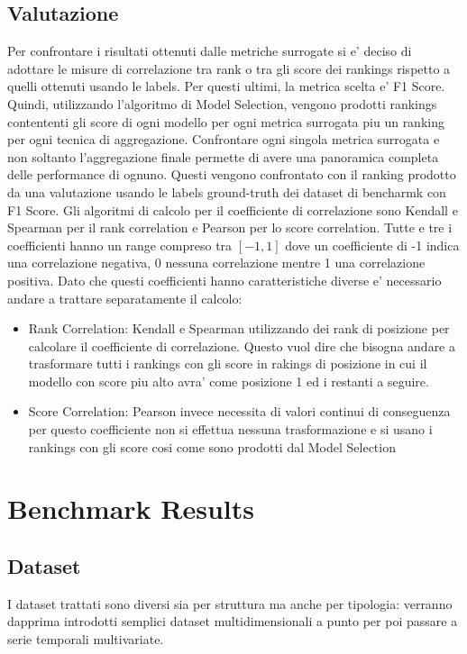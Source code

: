 \subsection{Valutazione}
Per confrontare i risultati ottenuti dalle metriche surrogate si e' deciso di adottare le misure di correlazione tra rank o tra gli score dei rankings rispetto a quelli ottenuti usando le labels. Per questi ultimi, la metrica scelta e' F1 Score.
Quindi, utilizzando l'algoritmo di Model Selection, vengono prodotti rankings contententi gli score di ogni modello per ogni metrica surrogata piu un ranking per ogni tecnica di aggregazione. Confrontare ogni singola metrica surrogata e non soltanto l'aggregazione finale permette di avere una panoramica completa delle performance di ognuno.
Questi vengono confrontato con il ranking prodotto  da una valutazione usando le labels ground-truth dei dataset di bencharmk con F1 Score.
Gli algoritmi di calcolo per il coefficiente di correlazione sono Kendall e Spearman per il rank correlation e Pearson per lo score correlation. Tutte e tre i coefficienti hanno un range compreso tra $[-1,1]$ dove un coefficiente di -1 indica una correlazione negativa, 0 nessuna correlazione mentre 1 una correlazione positiva. 
Dato che questi coefficienti hanno caratteristiche diverse e' necessario andare a trattare separatamente il calcolo:
\begin{itemize}
	\item Rank Correlation: Kendall e Spearman utilizzando dei rank di posizione per calcolare il coefficiente di correlazione. Questo vuol dire che bisogna andare a trasformare tutti i rankings con gli score in rakings di posizione in cui il modello con score piu alto avra' come posizione 1 ed i restanti a seguire.
	\item Score Correlation: Pearson invece necessita di valori continui di conseguenza per questo coefficiente non si effettua nessuna trasformazione e si usano i rankings con gli score cosi come sono prodotti dal Model Selection
\end{itemize}

 

\newpage
\section{Benchmark Results}
\subsection{Dataset}
I dataset trattati sono diversi sia per struttura ma anche per tipologia: verranno dapprima introdotti semplici dataset multidimensionali a punto per poi passare a serie temporali multivariate. 

